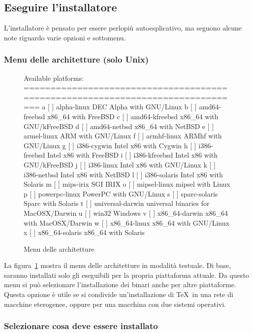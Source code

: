 \documentclass{article}
\begin{document}
\subsection{Eseguire l'installatore}
\label{sec:runinstall}

L'installatore è pensato per essere perlopiù autoesplicativo, ma seguono
alcune note riguardo varie opzioni e sottomenu.

\subsubsection{Menu delle architetture (solo Unix)}
\label{sec:binary}

\begin{figure}[tb]
\begin{boxedverbatim}
Available platforms:
===============================================================================
   a [ ] alpha-linux      DEC Alpha with GNU/Linux
   b [ ] amd64-freebsd    x86_64 with FreeBSD
   c [ ] amd64-kfreebsd   x86_64 with GNU/kFreeBSD
   d [ ] amd64-netbsd     x86_64 with NetBSD
   e [ ] armel-linux      ARM with GNU/Linux
   f [ ] armhf-linux      ARMhf with GNU/Linux
   g [ ] i386-cygwin      Intel x86 with Cygwin
   h [ ] i386-freebsd     Intel x86 with FreeBSD
   i [ ] i386-kfreebsd    Intel x86 with GNU/kFreeBSD
   j [ ] i386-linux       Intel x86 with GNU/Linux
   k [ ] i386-netbsd      Intel x86 with NetBSD
   l [ ] i386-solaris     Intel x86 with Solaris
   m [ ] mips-irix        SGI IRIX
   o [ ] mipsel-linux     mipsel with Linux
   p [ ] powerpc-linux    PowerPC with GNU/Linux
   s [ ] sparc-solaris    Sparc with Solaris
   t [ ] universal-darwin universal binaries for MacOSX/Darwin
   u [ ] win32            Windows
   v [ ] x86_64-darwin    x86_64 with MacOSX/Darwin
   w [ ] x86_64-linux     x86_64 with GNU/Linux
   x [ ] x86_64-solaris   x86_64 with Solaris
\end{boxedverbatim}
\caption{Menu delle architetture}\label{fig:bin-text}
\end{figure}

La figura~\ref{fig:bin-text} mostra il menu delle architetture in modalità
testuale. Di base, saranno installati solo gli eseguibili per la propria
piattaforma attuale. Da questo menu si può selezionare l'installazione
dei binari anche per altre piattaforme. Questa opzione è utile se si
condivide un'installazione di \TeX\ in una rete di macchine eterogenee,
oppure per una macchina con due sistemi operativi.

\subsubsection{Selezionare cosa deve essere installato}
\label{sec:components}
\end{document}
